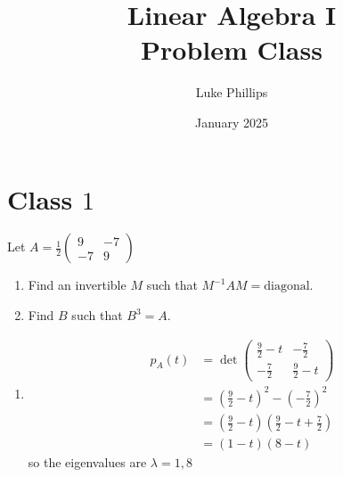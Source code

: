 \documentclass[10pt, a4paper]{article}
\title{Linear Algebra I \\
\large Problem Class}
\author{Luke Phillips}
\date{January 2025}
\begin{document}
\maketitle

\newpage

\tableofcontents

\newpage

\section{Class \texorpdfstring{$1$}{}}

\begin{problem}
    Let $A = \frac{1}{2}\begin{pmatrix}
        9 & -7 \\
        -7 & 9
    \end{pmatrix}$

    \begin{enumerate}[label = (\alph*)]
        \item Find an invertible $M$ such that $M ^ {-1}AM = \text{diagonal}$.

        \item Find $B$ such that $B ^ 3 = A$.
    \end{enumerate}

    \begin{solution}\phantom{}
        \begin{enumerate}[label = (\alph*)]
            \item
            \begin{align*}
                p_A(t) &= \det\begin{pmatrix}
                    \frac{9}{2} - t & -\frac{7}{2} \\
                    -\frac{7}{2} & \frac{9}{2} - t
                \end{pmatrix} \\
                &= \left(\frac{9}{2} - t\right) ^ 2 - \left(-\frac{7}{2}\right) ^ 2 \\
                &= \left(\frac{9}{2} - t\right)\left(\frac{9}{2} - t + \frac{7}{2}\right) \\
                &= (1 - t)(8 - t)
            \end{align*}
            so the eigenvalues are $\lambda = 1, 8$
        

\end{enumerate}
\end{solution}
\end{problem}
\end{document}
